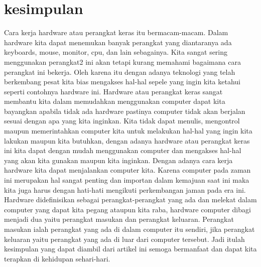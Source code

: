 \section {kesimpulan}
Cara kerja hardware atau perangkat keras itu bermacam-macam. Dalam hardware kita dapat menemukan banyak perangkat yang diantaranya ada keyboards, mouse, monitor, cpu, dan lain sebagainya. Kita sangat sering menggunakan perangkat2 ini akan tetapi kurang memahami bagaimana cara perangkat ini bekerja. Oleh karena itu dengan adanya teknologi yang telah berkembang pesat kita bias mengakses hal-hal sepele yang ingin kita ketahui seperti contohnya hardware ini. Hardware atau perangkat keras sangat membantu kita dalam memudahkan menggunakan computer dapat kita bayangkan apabila tidak ada hardware pastinya computer tidak akan berjalan sesuai dengan apa yang kita inginkan. Kita tidak dapat menulis, mengontrol maupun memerintahkan computer kita untuk melakukan hal-hal yang ingin kita lakukan maupun kita butuhkan, dengan adanya hardware atau perangkat keras ini kita dapat dengan mudah menggunakan computer dan mengakses hal-hal yang akan kita gunakan maupun kita inginkan. Dengan adanya cara kerja hardware kita dapat menjalankan computer kita. Karena computer pada zaman ini merupakan hal sangat penting dan importan dalam kemajuan saat ini maka kita juga harus dengan hati-hati mengikuti perkembangan jaman pada era ini. Hardware didefinisikan sebagai perangkat-perangkat yang ada dan melekat dalam computer yang dapat kita pegang ataupun kita raba, hardware computer dibagi menjadi dua yaitu perangkat masukan dan perangkat keluaran. Perangkat masukan ialah perangkat yang ada di dalam computer itu sendiri, jika perangkat keluaran yaitu perangkat yang ada di luar dari computer tersebut. Jadi itulah kesimpulan yang dapat diambil dari artikel ini semoga bermanfaat dan dapat kita terapkan di kehidupan sehari-hari.

